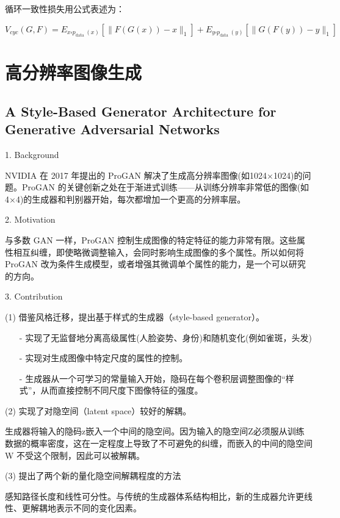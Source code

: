 循环一致性损失用公式表述为：

\begin{equation}
V_{c y c}(G, F)=E_{x \square p_{\text {data }}(x)}\left[\|F(G(x))-x\|_{1}\right]+E_{y \square p_{\text {data }}(y)}\left[\|G(F(y))-y\|_{1}\right]
\end{equation}

\section{高分辨率图像生成}

\subsection{A Style-Based Generator Architecture for Generative Adversarial Networks}

1. Background

NVIDIA 在 2017 年提出的 ProGAN 解决了生成高分辨率图像(如1024×1024)的问题。ProGAN 的关键创新之处在于渐进式训练——从训练分辨率非常低的图像(如4×4)的生成器和判别器开始，每次都增加一个更高的分辨率层。

2. Motivation

与多数 GAN 一样，ProGAN 控制生成图像的特定特征的能力非常有限。这些属性相互纠缠，即使略微调整输入，会同时影响生成图像的多个属性。所以如何将 ProGAN 改为条件生成模型，或者增强其微调单个属性的能力，是一个可以研究的方向。

3. Contribution

(1) 借鉴风格迁移，提出基于样式的生成器（style-based generator）。

\begin{enumerate}
 \item [-] 实现了无监督地分离高级属性(人脸姿势、身份)和随机变化(例如雀斑，头发)
 \item [-] 实现对生成图像中特定尺度的属性的控制。
 \item [-] 生成器从一个可学习的常量输入开始，隐码在每个卷积层调整图像的“样式”，从而直接控制不同尺度下图像特征的强度。
\end{enumerate}

(2) 实现了对隐空间（latent space）较好的解耦。

生成器将输入的隐码z嵌入一个中间的隐空间。因为输入的隐空间Z必须服从训练数据的概率密度，这在一定程度上导致了不可避免的纠缠，而嵌入的中间的隐空间 W 不受这个限制，因此可以被解耦。

(3) 提出了两个新的量化隐空间解耦程度的方法

感知路径长度和线性可分性。与传统的生成器体系结构相比，新的生成器允许更线性、更解耦地表示不同的变化因素。

